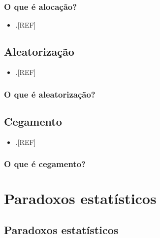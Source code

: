 \documentclass[
  a4paper,
]{book}
\providecommand{\tightlist}{%
  \setlength{\itemsep}{0pt}\setlength{\parskip}{0pt}}
\begin{document}
\hypertarget{o-que-uxe9-alocauxe7uxe3o}{%
\subsection{O que é alocação?}\label{o-que-uxe9-alocauxe7uxe3o}}

\begin{itemize}
\tightlist
\item
  .{[}REF{]}
\end{itemize}

\hypertarget{aleatorizauxe7uxe3o}{%
\section{Aleatorização}\label{aleatorizauxe7uxe3o}}

\begin{itemize}
\tightlist
\item
  .{[}REF{]}
\end{itemize}

\hypertarget{o-que-uxe9-aleatorizauxe7uxe3o}{%
\subsection{O que é aleatorização?}\label{o-que-uxe9-aleatorizauxe7uxe3o}}

\hypertarget{cegamento}{%
\section{Cegamento}\label{cegamento}}

\begin{itemize}
\tightlist
\item
  .{[}REF{]}
\end{itemize}

\hypertarget{o-que-uxe9-cegamento}{%
\subsection{O que é cegamento?}\label{o-que-uxe9-cegamento}}

\hypertarget{paradoxos-estatisticos}{%
\chapter{\texorpdfstring{\textbf{Paradoxos estatísticos}}{Paradoxos estatísticos}}\label{paradoxos-estatisticos}}

\hypertarget{paradoxos}{%
\section{Paradoxos estatísticos}\label{paradoxos}}
\end{document}
